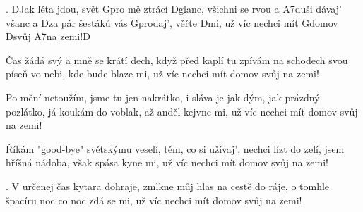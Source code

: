 

. DJak léta jdou, svět Gpro mě ztrácí Dglanc, 
všichni se rvou a A7duši dávaj' všanc 
a Dza pár šestáků vás Gprodaj', věřte Dmi, 
už víc nechci mít Gdomov Dsvůj A7na zemi!D 
\ks

\zr
Čas žádá svý a mně se krátí dech, 
když před kaplí tu zpívám na schodech 
svou píseň vo nebi, kde bude blaze mi, 
už víc nechci mít domov svůj na zemi! 
\kr

\zs
Po mění netoužím, jsme tu jen nakrátko, 
i sláva je jak dým, jak prázdný pozlátko, 
já koukám do voblak, až anděl kejvne mi, 
už víc nechci mít domov svůj na zemi! 
\ks

\zr \kr 

\zs
Říkám "good-bye" světskýmu veselí, 
těm, co si užívaj', nechci lízt do zelí, 
jsem hříšná nádoba, však spása kyne mi, 
už víc nechci mít domov svůj na zemi! 
\ks

\zr \kr

. V určenej čas kytara dohraje, 
zmlkne můj hlas na cestě do ráje, 
o tomhle špacíru noc co noc zdá se mi, 
už víc nechci mít domov svůj na zemi! 
\ks

\zr \kr
\kp

